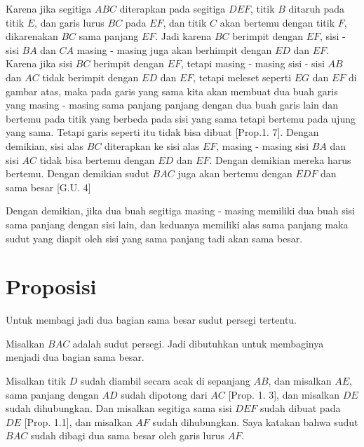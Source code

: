 \documentclass[a4paper]{book}
\begin{document}
Karena jika segitiga $ABC$ diterapkan pada segitiga $DEF$, titik $B$ ditaruh
pada titik $E$, dan garis lurus $BC$ pada $EF$, dan titik $C$ akan bertemu
dengan titik $F$, dikarenakan $BC$ sama panjang $EF$. Jadi karena $BC$
berimpit dengan $EF$, sisi - sisi $BA$ dan $CA$ masing - masing juga akan 
berhimpit dengan $ED$ dan $EF$. Karena jika sisi $BC$  berimpit dengan $EF$, 
tetapi masing - masing sisi - sisi $AB$ dan $AC$  tidak berimpit dengan 
$ED$ dan $EF$, tetapi meleset seperti $EG$ dan $EF$ di gambar atas, maka 
pada garis yang sama kita akan membuat dua buah garis yang masing - masing
sama panjang panjang dengan dua buah garis lain dan bertemu pada titik yang
berbeda pada sisi yang sama tetapi bertemu pada ujung yang sama. Tetapi garis
seperti itu tidak bisa dibuat [Prop.1. 7]. Dengan demikian, sisi alas $BC$ 
diterapkan ke sisi alas $EF$, masing - masing sisi $BA$ dan sisi  $AC$ tidak 
bisa bertemu dengan $ED$ dan $EF$. Dengan demikian mereka harus bertemu.
Dengan demikian sudut $BAC$ juga akan bertemu dengan $EDF$ dan sama besar 
[G.U. 4]

Dengan demikian, jika dua buah segitiga masing - masing memiliki dua buah 
sisi sama panjang dengan sisi lain, dan keduanya memiliki alas 
sama panjang maka sudut yang diapit oleh sisi yang sama panjang tadi akan 
sama besar.

\section*{\centering Proposisi \thesection} 
Untuk membagi jadi dua bagian sama besar sudut persegi tertentu.
\begin{center}
\end{center} 

Misalkan $BAC$ adalah sudut persegi. Jadi dibutuhkan untuk 
membaginya menjadi dua bagian sama besar.

Misalkan titik $D$ sudah diambil secara acak di sepanjang $AB$, dan misalkan
$AE$, sama panjang dengan $AD$ sudah dipotong dari $AC$ [Prop. 1. 3], dan 
misalkan $DE$ sudah dihubungkan. Dan misalkan segitiga sama sisi $DEF$ sudah
dibuat pada $DE$ [Prop. 1.1], dan misalkan $AF$ sudah dihubungkan. Saya 
katakan bahwa sudut $BAC$ sudah dibagi dua sama besar oleh garis lurus $AF$.
\end{document}
